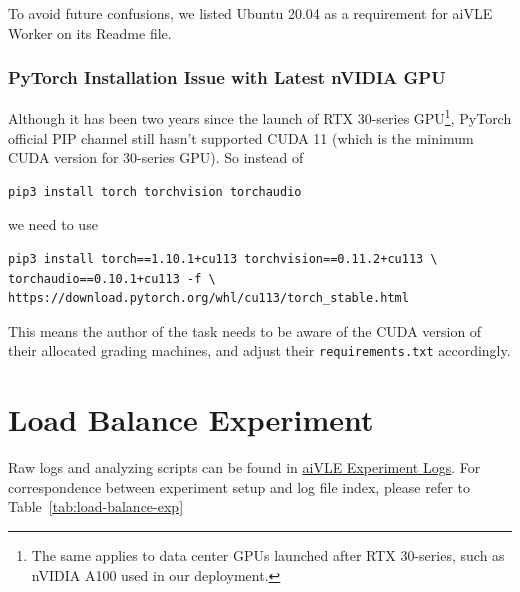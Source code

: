 To avoid future confusions, we listed Ubuntu 20.04 as a requirement for aiVLE Worker on its Readme file.

\subsubsection{PyTorch Installation Issue with Latest nVIDIA GPU}
Although it has been two years since the launch of RTX 30-series GPU\footnote{The same applies to data center GPUs launched after RTX 30-series, such as nVIDIA A100 used in our deployment.}, PyTorch official PIP channel still hasn't supported CUDA 11 (which is the minimum CUDA version for 30-series GPU). So instead of 
\begin{code}
\begin{verbatim}
pip3 install torch torchvision torchaudio
\end{verbatim}
\end{code}
we need to use
\begin{code}
\begin{verbatim}
pip3 install torch==1.10.1+cu113 torchvision==0.11.2+cu113 \
torchaudio==0.10.1+cu113 -f \
https://download.pytorch.org/whl/cu113/torch_stable.html
\end{verbatim}
\end{code}

This means the author of the task needs to be aware of the CUDA version of their allocated grading machines, and adjust their \texttt{requirements.txt} accordingly.

\section{Load Balance Experiment}
\label{s:load-balance-exp}
Raw logs and analyzing scripts can be found in \href{https://github.com/edu-ai/aivle-experiment-logs}{aiVLE Experiment Logs}. For correspondence between experiment setup and log file index, please refer to Table~\ref{tab:load-balance-exp}

